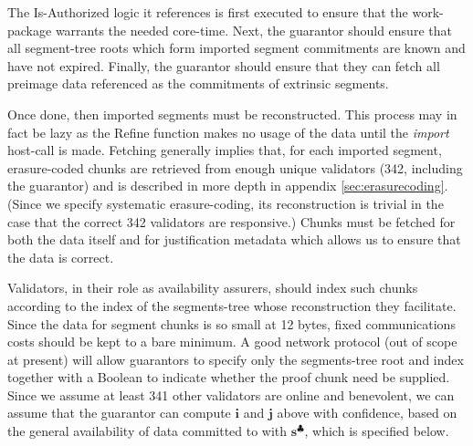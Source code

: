 The Is-Authorized logic it references is first executed to ensure that the work-package warrants the needed core-time. Next, the guarantor should ensure that all segment-tree roots which form imported segment commitments are known and have not expired. Finally, the guarantor should ensure that they can fetch all preimage data referenced as the commitments of extrinsic segments.

Once done, then imported segments must be reconstructed. This process may in fact be lazy as the Refine function makes no usage of the data until the \emph{import} host-call is made. Fetching generally implies that, for each imported segment, erasure-coded chunks are retrieved from enough unique validators (342, including the guarantor) and is described in more depth in appendix \ref{sec:erasurecoding}. (Since we specify systematic erasure-coding, its reconstruction is trivial in the case that the correct 342 validators are responsive.) Chunks must be fetched for both the data itself and for justification metadata which allows us to ensure that the data is correct.

Validators, in their role as availability assurers, should index such chunks according to the index of the segments-tree whose reconstruction they facilitate. Since the data for segment chunks is so small at 12 bytes, fixed communications costs should be kept to a bare minimum. A good network protocol (out of scope at present) will allow guarantors to specify only the segments-tree root and index together with a Boolean to indicate whether the proof chunk need be supplied. Since we assume at least 341 other validators are online and benevolent, we can assume that the guarantor can compute $\mathbf{i}$ and $\mathbf{j}$ above with confidence, based on the general availability of data committed to with $\mathbf{s}^\clubsuit$, which is specified below.


